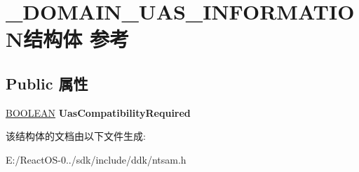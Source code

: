 \hypertarget{struct___d_o_m_a_i_n___u_a_s___i_n_f_o_r_m_a_t_i_o_n}{}\section{\+\_\+\+D\+O\+M\+A\+I\+N\+\_\+\+U\+A\+S\+\_\+\+I\+N\+F\+O\+R\+M\+A\+T\+I\+O\+N结构体 参考}
\label{struct___d_o_m_a_i_n___u_a_s___i_n_f_o_r_m_a_t_i_o_n}
\subsection*{Public 属性}
\begin{DoxyCompactItemize}
\item 
\mbox{\label{struct___d_o_m_a_i_n___u_a_s___i_n_f_o_r_m_a_t_i_o_n_a2f58b64fb184e76447a3a0a6d93519a2}} 
\hyperlink{_processor_bind_8h_a112e3146cb38b6ee95e64d85842e380a}{B\+O\+O\+L\+E\+AN} {\bfseries Uas\+Compatibility\+Required}
\end{DoxyCompactItemize}


该结构体的文档由以下文件生成\+:\begin{DoxyCompactItemize}
\item 
E\+:/\+React\+O\+S-\/0../sdk/include/ddk/ntsam.\+h\end{DoxyCompactItemize}
